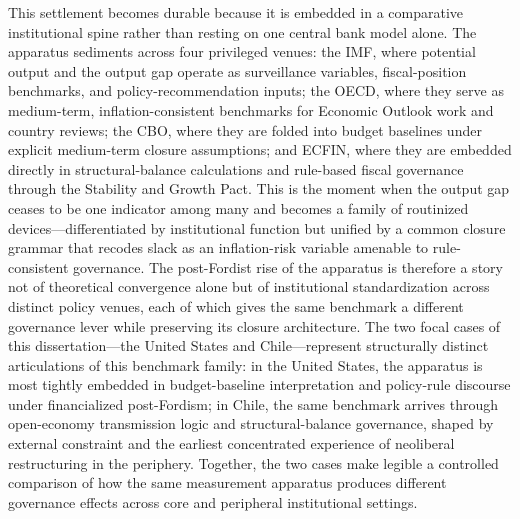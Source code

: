 \documentclass[11pt,a4paper]{article}
\begin{document}
This settlement becomes durable because it is embedded in a comparative
institutional spine rather than resting on one central bank model alone. The
apparatus sediments across four privileged venues: the IMF, where potential output
and the output gap operate as surveillance variables, fiscal-position benchmarks,
and policy-recommendation inputs; the OECD, where they serve as medium-term,
inflation-consistent benchmarks for Economic Outlook work and country reviews; the
CBO, where they are folded into budget baselines under explicit medium-term
closure assumptions; and ECFIN, where they are embedded directly in
structural-balance calculations and rule-based fiscal governance through the
Stability and Growth Pact. This is the moment when the output gap ceases to be
one indicator among many and becomes a family of routinized
devices---differentiated by institutional function but unified by a common closure
grammar that recodes slack as an inflation-risk variable amenable to
rule-consistent governance. The post-Fordist rise of the apparatus is therefore a
story not of theoretical convergence alone but of institutional standardization
across distinct policy venues, each of which gives the same benchmark a different
governance lever while preserving its closure architecture. The two focal cases of
this dissertation---the United States and Chile---represent structurally distinct
articulations of this benchmark family: in the United States, the apparatus is
most tightly embedded in budget-baseline interpretation and policy-rule discourse
under financialized post-Fordism; in Chile, the same benchmark arrives through
open-economy transmission logic and structural-balance governance, shaped by
external constraint and the earliest concentrated experience of neoliberal
restructuring in the periphery. Together, the two cases make legible a controlled
comparison of how the same measurement apparatus produces different governance
effects across core and peripheral institutional settings.


\end{document}
